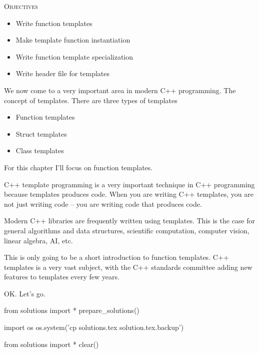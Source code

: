 
\textsc{Objectives}
\begin{itemize}
\item Write function templates
\item Make template function instantiation
\item Write function template specialization
\item Write header file for templates
\end{itemize}

We now come to a very important area in modern C++ programming. The
concept of templates. There are three types of templates

\begin{itemize}
\item Function templates
\item Struct templates
\item Class templates
\end{itemize}

For this chapter I'll focus on function templates.

C++ template programming is a very important technique in C++
programming because templates produces code. When you are writing C++
templates, you are not just writing code -- you are writing code that
produces code.

Modern C++ libraries are frequently written using templates. This is the
case for general algorithms and data structures, scientific computation,
computer vision, linear algebra, AI, etc.

This is only going to be a short introduction to function templates. C++
templates is a very vast subject, with the C++ standards committee
adding new features to templates every few years.

OK. Let's go.









\begin{python0}
from solutions import *
prepare_solutions()
\end{python0}
\begin{python}
import os
os.system('cp solutions.tex solution.tex.backup')  
\end{python}

\begin{python0}
from solutions import *
clear()
\end{python0}
